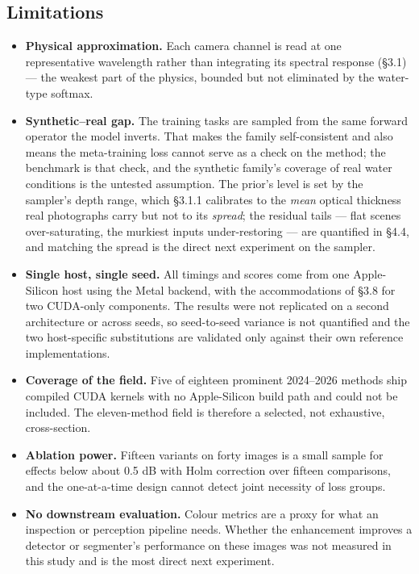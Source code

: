\documentclass[journal]{IEEEtran}
\begin{document}
\subsection{Limitations}
\begin{itemize}
\item \textbf{Physical approximation.} Each camera channel is read at one representative wavelength rather than integrating its spectral response (\S{}3.1) --- the weakest part of the physics, bounded but not eliminated by the water-type softmax.
\item \textbf{Synthetic--real gap.} The training tasks are sampled from the same forward operator the model inverts. That makes the family self-consistent and also means the meta-training loss cannot serve as a check on the method; the benchmark is that check, and the synthetic family's coverage of real water conditions is the untested assumption. The prior's level is set by the sampler's depth range, which \S{}3.1.1 calibrates to the \emph{mean} optical thickness real photographs carry but not to its \emph{spread}; the residual tails --- flat scenes over-saturating, the murkiest inputs under-restoring --- are quantified in \S{}4.4, and matching the spread is the direct next experiment on the sampler.
\item \textbf{Single host, single seed.} All timings and scores come from one Apple-Silicon host using the Metal backend, with the accommodations of \S{}3.8 for two CUDA-only components. The results were not replicated on a second architecture or across seeds, so seed-to-seed variance is not quantified and the two host-specific substitutions are validated only against their own reference implementations.
\item \textbf{Coverage of the field.} Five of eighteen prominent 2024--2026 methods ship compiled CUDA kernels with no Apple-Silicon build path and could not be included. The eleven-method field is therefore a selected, not exhaustive, cross-section.
\item \textbf{Ablation power.} Fifteen variants on forty images is a small sample for effects below about 0.5 dB with Holm correction over fifteen comparisons, and the one-at-a-time design cannot detect joint necessity of loss groups.
\item \textbf{No downstream evaluation.} Colour metrics are a proxy for what an inspection or perception pipeline needs. Whether the enhancement improves a detector or segmenter's performance on these images was not measured in this study and is the most direct next experiment.
\end{itemize}
\end{document}
